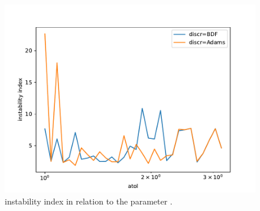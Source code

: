 \documentclass{report}
\begin{document}
\begin{figure}[h]
\centering
\begin{minipage}[b]{0.45\textwidth}
\centering
\includegraphics[width=\textwidth]{../Plots/Task4/Figure_404}
\caption{instability index in relation to the parameter .}
\label{pl:stability3}
\end{minipage}
\end{figure}
\end{document}
